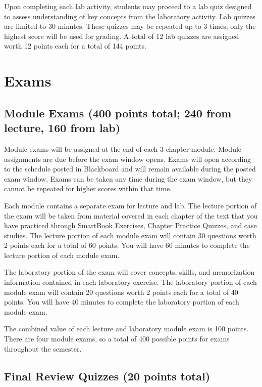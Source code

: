 Upon completing each lab activity, students may proceed to a lab quiz designed to assess understanding of key concepts from the laboratory activity. Lab quizzes are limited to 30 minutes. These quizzes may be repeated up to 3 times, only the highest score will be used for grading. A total of 12 lab quizzes are assigned worth 12 points each for a total of 144 points.

\section*{Exams}

\subsection*{Module Exams (400 points total; 240 from lecture, 160 from lab)}

Module exams will be assigned at the end of each 3-chapter module. Module assignments are due before the exam window opens. Exams will open according to the schedule posted in Blackboard and will remain available during the posted exam window. Exams can be taken any time during the exam window, but they cannot be repeated for higher scores within that time.

Each module contains a separate exam for lecture and lab. The lecture portion of the exam will be taken from material covered in each chapter of the text that you have practiced through SmartBook Exercises, Chapter Practice Quizzes, and case studies. The lecture portion of each module exam will contain 30 questions worth 2 points each for a total of 60 points. You will have 60 minutes to complete the lecture portion of each module exam.

The laboratory portion of the exam will cover concepts, skills, and memorization information contained in each laboratory exercise. The laboratory portion of each module exam will contain 20 questions worth 2 points each for a total of 40 points. You will have 40 minutes to complete the laboratory portion of each module exam.

The combined value of each lecture and laboratory module exam is 100 points. There are four module exams, so a total of 400 possible points for exams throughout the semester.

\subsection*{Final Review Quizzes (20 points total)}

